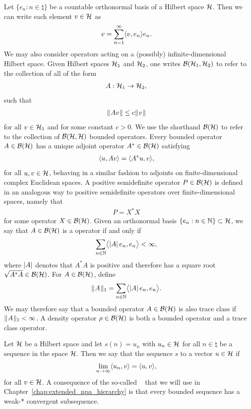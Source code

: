 Let $\{e_n : n \in \natural \}$ be a countable orthonormal basis of a Hilbert space $\mathcal{H}$. Then we can write each element $v \in \mathcal{H}$ as 
\begin{align}
	v = \sum_{n=1}^{\infty} \langle v , e_n\rangle e_n.
\end{align}
We may also consider operators acting on a (possibly) infinite-dimensional Hilbert space. Given Hilbert spaces $\mathcal{H}_1$ and $\mathcal{H}_2$, one writes $\mathcal{B}(\mathcal{H}_1,\mathcal{H}_2)$ to refer to the collection of all  of the form
\begin{align}
	A : \mathcal{H}_1 \rightarrow \mathcal{H}_2,
\end{align}
such that 
\begin{align}
	\lVert\mspace{1mu} Av \mspace{1mu}\rVert \leq c\lVert\mspace{1mu} v \mspace{1mu}\rVert
\end{align}
for all $v \in \mathcal{H}_1$ and for some constant $c > 0$. We use the shorthand $\mathcal{B}(\mathcal{H})$ to refer to the collection of $\mathcal{B}(\mathcal{H},\mathcal{H})$ bounded operators. Every bounded operator $A \in \mathcal{B}(\mathcal{H})$ has a unique adjoint operator $A^* \in \mathcal{B}(\mathcal{H})$ satisfying 
\begin{align}
	\langle u , Av\rangle = \langle A^*u , v\rangle,
\end{align}
for all $u,v \in \mathcal{H}$, behaving in a similar fashion to adjoints on finite-dimensional complex Euclidean spaces. A positive semidefinite operator $P \in \mathcal{B}(\mathcal{H})$ is defined in an analogous way to positive semidefinite operators over finite-dimensional spaces, namely that 
\begin{align}
	P = X^*X
\end{align}
for some operator $X \in \mathcal{B}(\mathcal{H})$. Given an orthonormal basis $\{e_n : n \in \mathbb{N}\} \subset \mathcal{H}$, we say that $A \in \mathcal{B}(\mathcal{H})$ is a  operator if and only if 
\begin{align}
	\sum_{n \in \mathbb{N}} \bigl\langle  \left\lvert A \right\rvert e_n, e_n \bigr\rangle < \infty,
\end{align} 
where $\left\lvert A \right\rvert$ denotes that $A^*A$ is positive and therefore has a square root $\sqrt{A^*A} \in \mathcal{B}(\mathcal{H})$. For $A \in \mathcal{B}(\mathcal{H})$, define 
\begin{align}
	\lVert\mspace{1mu} A \mspace{1mu}\rVert_1 = \sum_{n \in \mathbb{N}} \bigl\langle \left\lvert A \right\rvert e_n, e_n \bigr\rangle.
\end{align}
We may therefore say that a bounded operator $A \in \mathcal{B}(\mathcal{H})$ is also trace class if $\lVert\mspace{1mu} A \mspace{1mu}\rVert_1 < \infty$. A density operator $\rho \in \mathcal{B}(\mathcal{H})$ is both a bounded operator and a trace class operator.  

Let $\mathcal{H}$ be a Hilbert space and let $s(n) = u_n$ with $u_n \in \mathcal{H}$ for all $n \in \natural$ be a sequence in the space $\mathcal{H}$. Then we say that the sequence $s$  to a vector $u \in \mathcal{H}$ if 
\begin{align}
	\lim_{n \rightarrow \infty} \langle u_n , v\rangle = \langle u , v\rangle,
\end{align}
for all $v \in \mathcal{H}$. A consequence of the so-called ~\cite{Rudin1991} that we will use in Chapter~\ref{chap:extended_npa_hierarchy} is that every bounded sequence has a weak-* convergent subsequence. 
 
